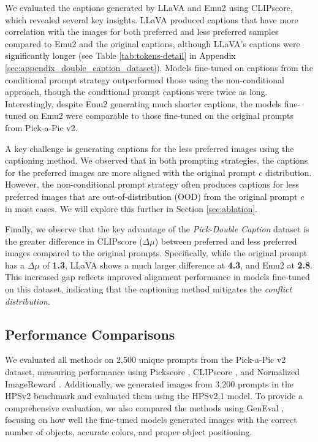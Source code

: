 We evaluated the captions generated by LLaVA and Emu2 using CLIPscore, which revealed several key insights. LLaVA produced captions that have more correlation with the images for both preferred and less preferred samples compared to Emu2 and the original captions, although LLaVA's captions were significantly longer (see Table \ref{tab:tokens-detail} in Appendix \ref{sec:appendix_double_caption_dataset}). Models fine-tuned on captions from the conditional prompt strategy outperformed those using the non-conditional approach, though the conditional prompt captions were twice as long. Interestingly, despite Emu2 generating much shorter captions, the models fine-tuned on Emu2 were comparable to those fine-tuned on the original prompts from Pick-a-Pic v2.

A key challenge is generating captions for the less preferred images using the captioning method. We observed that in both prompting strategies, the captions for the preferred images are more aligned with the original prompt \( c \) distribution. However, the non-conditional prompt strategy often produces captions for less preferred images that are out-of-distribution (OOD) from the original prompt \( c \) in most cases. We will explore this further in Section \ref{sec:ablation}.




Finally, we observe that the key advantage of the \textit{Pick-Double Caption} dataset is the greater difference in CLIPscore (\( \Delta \mu \)) between preferred and less preferred images compared to the original prompts. Specifically, while the original prompt has a \( \Delta \mu \) of \textbf{1.3}, LLaVA shows a much larger difference at \textbf{4.3}, and Emu2 at \textbf{2.8}. This increased gap reflects improved alignment performance in models fine-tuned on this dataset, indicating that the captioning method mitigates the \textit{conflict distribution}.

\subsection{Performance Comparisons}


We evaluated all methods on 2,500 unique prompts from the Pick-a-Pic v2 \citep{kirstain2023pickapic} dataset, measuring performance using Pickscore \citep{kirstain2023pickapic}, CLIPscore \citep{hessel2022clipscorereferencefreeevaluationmetric}, and Normalized ImageReward \citep{xu2023imagerewardlearningevaluatinghuman}. Additionally, we generated images from 3,200 prompts in the HPSv2 \citep{wu2023human2} benchmark and evaluated them using the HPSv2.1 model. To provide a comprehensive evaluation, we also compared the methods using GenEval \citep{ghosh2023genevalobjectfocusedframeworkevaluating}, focusing on how well the fine-tuned models generated images with the correct number of objects, accurate colors, and proper object positioning.



